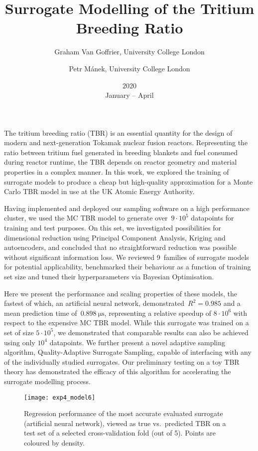 \documentclass{article}
\title{Surrogate Modelling of the Tritium Breeding Ratio}
\date{2020\\ January -- April}
\author{
	Graham Van Goffrier, University College London\\
	\and Petr Mánek, University College London
}
\begin{document}
\maketitle

The tritium breeding ratio (TBR) is an essential quantity for the design of
modern and next-generation Tokamak nuclear fusion reactors. Representing the
ratio between tritium fuel generated in breeding blankets and fuel consumed
during reactor runtime, the TBR depends on reactor geometry and material
properties in a complex manner. In this work, we explored the
training of surrogate models to produce a cheap but high-quality approximation
for a Monte Carlo TBR model in use at the UK Atomic Energy Authority.

Having implemented and deployed our sampling software on a high performance cluster, we
used the MC TBR model to generate over~$9\cdot 10^5$ datapoints for training and
test purposes. On this set, we investigated possibilities for
dimensional reduction using Principal Component Analysis, Kriging and
autoencoders, and concluded that no straightforward reduction was possible
without significant information loss. We reviewed 9~families of surrogate models for potential
applicability, benchmarked their behaviour as a function of training set size and tuned their
hyperparameters via Bayesian Optimisation.

Here we present the performance and scaling properties of these
models, the fastest of which, an artificial neural network,
demonstrated~$R^2=\num{0.985}$ and a mean
prediction time of~$\SI{0.898}{\micro\second}$, representing a relative speedup of $8\cdot 10^6$
with respect to the expensive MC TBR model. While this surrogate was trained on
a set of size $5\cdot 10^5$, we demonstrated that comparable results can also be
achieved using only $10^4$ datapoints. We further present a novel adaptive
sampling algorithm, Quality-Adaptive Surrogate Sampling, capable
of interfacing with any of the individually studied surrogates. Our preliminary
testing on a toy TBR theory has demonstrated the efficacy of this algorithm for
accelerating the surrogate modelling process.

\begin{figure}[h]
	\centering
	\texttt{[image: exp4\_model6]}
	\caption{Regression performance of the most accurate evaluated surrogate
		(artificial neural network), viewed as true vs.~predicted TBR on a test
		set of a selected cross-validation fold (out of 5). Points are coloured by density.}
\end{figure}
\end{document}
